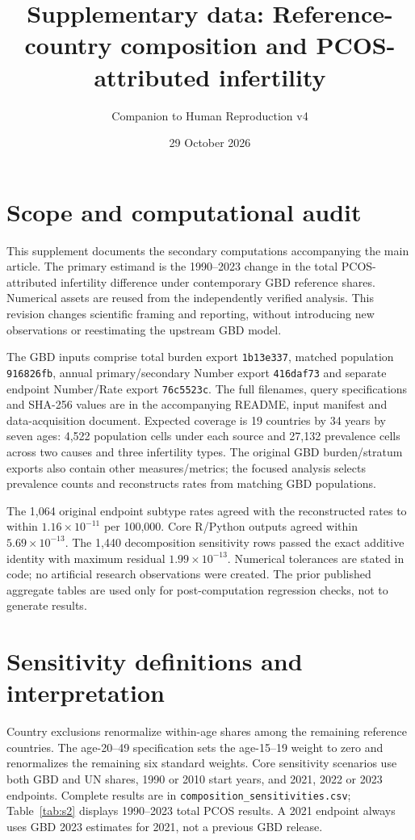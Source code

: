\documentclass[11pt,a4paper]{article}
\title{Supplementary data: Reference-country composition and PCOS-attributed infertility}
\author{Companion to Human Reproduction v4}
\date{29 October 2026}
\begin{document}
\maketitle\thispagestyle{fancy}
\renewcommand{\thetable}{S\arabic{table}}\setcounter{table}{0}
\renewcommand{\thefigure}{S\arabic{figure}}\setcounter{figure}{0}
\section{Scope and computational audit}
This supplement documents the secondary computations accompanying the main article. The primary estimand is the 1990--2023 change in the total PCOS-attributed infertility difference under contemporary GBD reference shares. Numerical assets are reused from the independently verified analysis. This revision changes scientific framing and reporting, without introducing new observations or reestimating the upstream GBD model.

The GBD inputs comprise total burden export \texttt{1b13e337}, matched population \texttt{916826fb}, annual primary/secondary Number export \texttt{416daf73} and separate endpoint Number/Rate export \texttt{76c5523c}. The full filenames, query specifications and SHA-256 values are in the accompanying README, input manifest and data-acquisition document. Expected coverage is 19 countries by 34 years by seven ages: 4,522 population cells under each source and 27,132 prevalence cells across two causes and three infertility types. The original GBD burden/stratum exports also contain other measures/metrics; the focused analysis selects prevalence counts and reconstructs rates from matching GBD populations.

The 1,064 original endpoint subtype rates agreed with the reconstructed rates to within $1.16\times10^{-11}$ per 100,000. Core R/Python outputs agreed within $5.69\times10^{-13}$. The 1,440 decomposition sensitivity rows passed the exact additive identity with maximum residual $1.99\times10^{-13}$. Numerical tolerances are stated in code; no artificial research observations were created. The prior published aggregate tables are used only for post-computation regression checks, not to generate results.

\section{Sensitivity definitions and interpretation}
Country exclusions renormalize within-age shares among the remaining reference countries. The age-20--49 specification sets the age-15--19 weight to zero and renormalizes the remaining six standard weights. Core sensitivity scenarios use both GBD and UN shares, 1990 or 2010 start years, and 2021, 2022 or 2023 endpoints. Complete results are in \texttt{composition\_sensitivities.csv}; Table~\ref{tab:s2} displays 1990--2023 total PCOS results. A 2021 endpoint always uses GBD 2023 estimates for 2021, not a previous GBD release.
\end{document}
